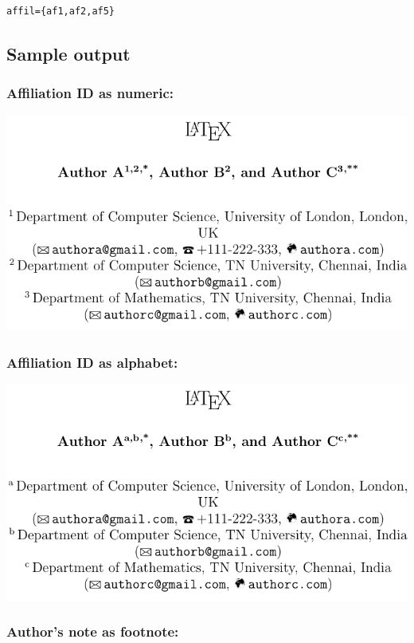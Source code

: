 \documentclass{article}
\begin{document}
\begin{lstlisting}[style=mystyle]
  affil={af1,af2,af5}
\end{lstlisting}

\subsection*{Sample output}

\subsubsection*{Affiliation ID as numeric:}

\noindent\centerline{\includegraphics[width=.8\textwidth]{affilauthor-image1.pdf}}

\subsubsection*{Affiliation ID as alphabet:}

\noindent\centerline{\includegraphics[width=.8\textwidth]{affilauthor-image2.pdf}}

\subsubsection*{Author's note as footnote:}
\end{document}
